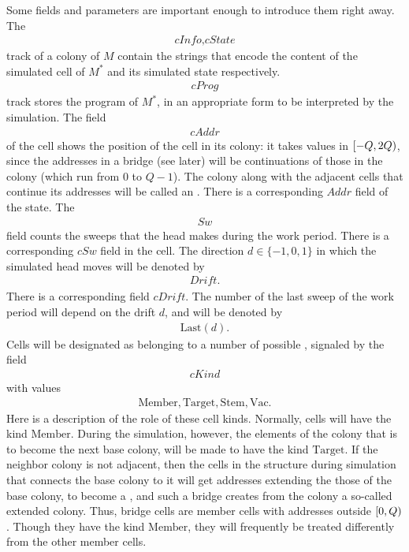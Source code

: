 \documentclass[12pt]{memoir}
\newcommand{\fld}[1]{\ensuremath{\textit{#1}}}
\newcommand{\Addr}{\fld{Addr}}
\newcommand{\cAddr}{\fld{cAddr}}
\newcommand{\Drift}{\fld{Drift}}
\newcommand{\cDrift}{\fld{cDrift}}
\newcommand{\cInfo}{\fld{cInfo}}
\newcommand{\cKind}{\fld{cKind}}
\newcommand{\cProg}{\fld{cProg}}
\newcommand{\cState}{\fld{cState}}
\newcommand{\Sweep}{\fld{Sw}}
\newcommand{\cSweep}{\fld{cSw}}
\newcommand{\Last}{\mathrm{Last}}
\newcommand{\Member}{\mathrm{Member}}
\newcommand{\Target}{\mathrm{Target}}
\newcommand{\Stem}{\mathrm{Stem}}
\newcommand{\Vacant}{\mathrm{Vac}}
\begin{document}
Some fields and parameters are important enough to introduce them right away.
The 
\begin{align*}
   \cInfo,\cState
 \end{align*}
track of a colony of \( M \)
contain the strings that encode the content of the simulated cell of \( M^{*} \) and
its simulated state respectively.
\begin{align*}
 \cProg
 \end{align*}
track stores the program of \( M^{*} \), in an appropriate form 
to be interpreted by the simulation.
The field 
 \begin{align*}
  \cAddr
 \end{align*}
of the cell shows the position of the cell in its colony:
it takes values in \( [-Q,2Q) \), since the addresses in a bridge (see later)
will be continuations of those in the colony (which run from \( 0 \) to \( Q-1 \)).
The colony along with the adjacent cells that continue its addresses will be called
an .
There is a corresponding \( \Addr \) field of the state.
The
 \begin{align*}
 \Sweep
 \end{align*}
field counts the sweeps that the head makes during the work period.
There is a corresponding \( \cSweep \) field in the cell.
The direction \( d\in\{-1,0,1\} \) in which the 
simulated head moves will be denoted by
 \begin{align*}
   \Drift.
 \end{align*}
There is a corresponding field \( \cDrift \).
The number of the last sweep of the work period will depend on the drift \( d \), 
and will be denoted by 
\begin{align}\label{eq:Last}
   \Last(d).
 \end{align}
Cells will be designated as belonging to a number of possible , signaled by the
field 
\begin{align*}
     \cKind
 \end{align*}
with values
       \begin{align*}
          \Member, \Target, \Stem, \Vacant.
       \end{align*}
Here is a description of the role of these cell kinds.
Normally, cells will have the kind \( \Member \).
During the simulation, however, the elements of the colony that is to become
the next base colony, will be made to have the kind \( \Target \).
If the neighbor colony 
is not adjacent, then the cells in the structure during simulation
that connects the base colony to it will get addresses extending the those of the base
colony,  to become a , and such a bridge creates from the colony a
so-called extended colony.
Thus, bridge cells are member cells with addresses outside \( [0,Q) \).
Though they have the kind \( \Member \), they will frequently be treated
differently from the other member cells.
\end{document}
